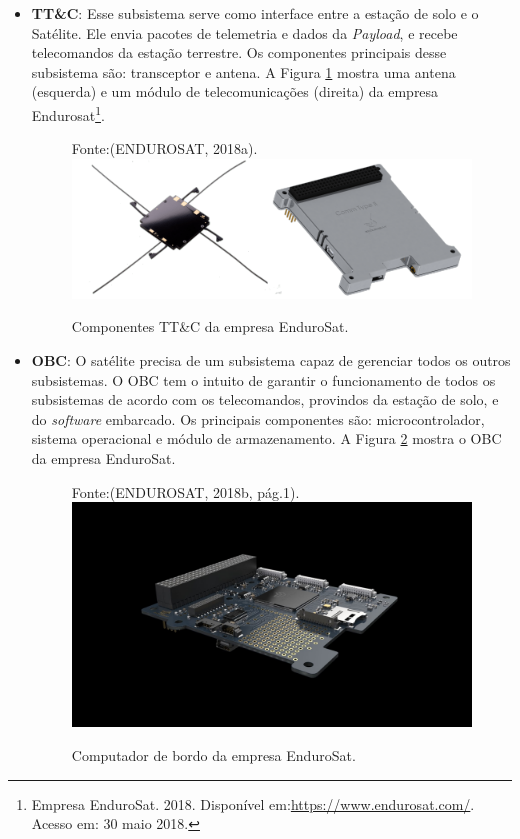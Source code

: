 \begin{itemize}
	\item \textbf{TT\&C}: Esse subsistema serve como interface entre a estação de solo e o Satélite. Ele envia pacotes de telemetria e dados da \textit{Payload}, e recebe telecomandos da estação terrestre. Os componentes principais desse subsistema são: transceptor e antena. A Figura \ref{fig10} mostra uma antena (esquerda) e um módulo de telecomunicações (direita) da empresa Endurosat\footnote{Empresa EnduroSat. 2018. Disponível em:\url{https://www.endurosat.com/}. Acesso em: 30 maio 2018.}.
	
	
	\begin{figure}[h]
	\footnotesize{
		\centering
		Fonte:(ENDUROSAT, 2018a).\linebreak
		\includegraphics[keepaspectratio=true,scale=2.2]{figuras/tt_c.png}
		\caption{Componentes TT\&C da empresa EnduroSat.}
		\label{fig10}
	}
	\end{figure}
	\FloatBarrier
	
	\item \textbf{OBC}: O satélite precisa de um subsistema capaz de gerenciar todos os outros subsistemas. O OBC tem o intuito de garantir o funcionamento de todos os subsistemas de acordo com os telecomandos, provindos da estação de solo, e do \textit{software} embarcado. Os principais componentes são: microcontrolador, sistema operacional e módulo de armazenamento.  A Figura \ref{fig11} mostra o OBC da empresa EnduroSat.
	
	\begin{figure}[h]
		\footnotesize{
		\centering	
		Fonte:(ENDUROSAT, 2018b, pág.1).
		\includegraphics[keepaspectratio=true,scale=0.2]{figuras/Cubesat-OBC-module-1.jpg}
		\caption{Computador de bordo da empresa EnduroSat.}
		\label{fig11}
	}
	\end{figure}
	\FloatBarrier
\end{itemize}

